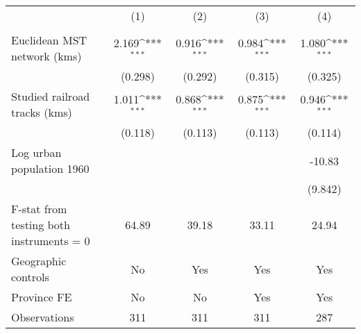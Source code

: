 {
\def\sym#1{\ifmmode^{#1}\else\(^{#1}\)\fi}
\begin{tabular}{l*{4}{c}}
\hline\hline
                &\multicolumn{1}{c}{(1)}&\multicolumn{1}{c}{(2)}&\multicolumn{1}{c}{(3)}&\multicolumn{1}{c}{(4)}\\
                &\multicolumn{1}{c}{}&\multicolumn{1}{c}{}&\multicolumn{1}{c}{}&\multicolumn{1}{c}{}\\
\hline
Euclidean MST network (kms)&    2.169\sym{***}&    0.916\sym{***}&    0.984\sym{***}&    1.080\sym{***}\\
                &  (0.298)         &  (0.292)         &  (0.315)         &  (0.325)         \\
[1em]
Studied railroad tracks (kms)&    1.011\sym{***}&    0.868\sym{***}&    0.875\sym{***}&    0.946\sym{***}\\
                &  (0.118)         &  (0.113)         &  (0.113)         &  (0.114)         \\
[1em]
Log urban population 1960&                  &                  &                  &   -10.83         \\
                &                  &                  &                  &  (9.842)         \\
\hline
F-stat from testing both instruments = 0&    64.89         &    39.18         &    33.11         &    24.94         \\
Geographic controls&       No         &      Yes         &      Yes         &      Yes         \\
Province FE     &       No         &       No         &      Yes         &      Yes         \\
Observations    &      311         &      311         &      311         &      287         \\
\hline\hline
\end{tabular}
}
